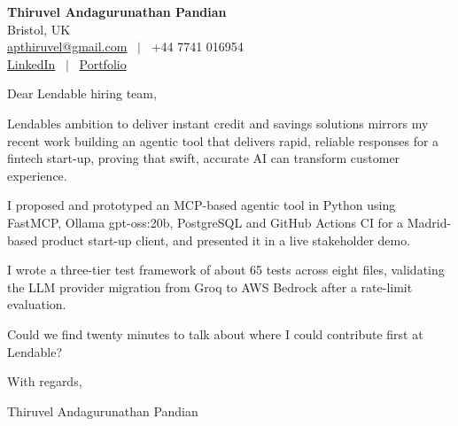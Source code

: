 \documentclass[11pt,a4paper]{article}
\begin{document}
\raggedright
\pagestyle{empty}

\begin{center}
    {\LARGE \color{linkblue} \textbf{Thiruvel Andagurunathan Pandian}}\\[0.2cm]
    Bristol, UK \\
    \href{mailto:apthiruvel@gmail.com}{apthiruvel@gmail.com} \ $|$ \ +44 7741 016954 \\
\href{https://www.linkedin.com/in/thiruvel-a-p/}{LinkedIn} \ $|$ \ \href{https://thiruvel-ap.github.io/PersonalPortfolio/}{Portfolio}
\end{center}

\vspace{0.4cm}

\noindent
Dear Lendable hiring team,

Lendable\textquotesingle{}s ambition to deliver instant credit and savings solutions mirrors my recent work building an agentic tool that delivers rapid, reliable responses for a fintech start-up, proving that swift, accurate AI can transform customer experience.

I proposed and prototyped an MCP-based agentic tool in Python using FastMCP, Ollama gpt-oss:20b, PostgreSQL and GitHub Actions CI for a Madrid-based product start-up client, and presented it in a live stakeholder demo.

I wrote a three-tier test framework of about 65 tests across eight files, validating the LLM provider migration from Groq to AWS Bedrock after a rate-limit evaluation.

Could we find twenty minutes to talk about where I could contribute first at Lendable?

\vspace{0.5cm}

With regards,

Thiruvel Andagurunathan Pandian
\end{document}
